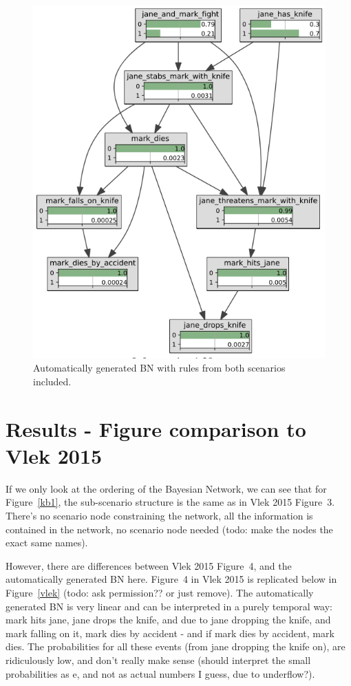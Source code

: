 \begin{figure}[htbp]
\begin{center}
\includegraphics[width=\linewidth]{images/Kb.png}
\caption{Automatically generated BN with rules from both scenarios included.}
\label{full}
\end{center}
\end{figure}

\section{Results - Figure comparison to Vlek 2015}
If we only look at the ordering of the Bayesian Network, we can see that for Figure~\ref{kb1}, the sub-scenario structure is the same as in Vlek 2015 Figure~3. There's no scenario node constraining the network, all the information is contained in the network, no scenario node needed (todo: make the nodes the exact same names).

However, there are differences between Vlek 2015 Figure~4, and the automatically generated BN here. Figure~4 in Vlek 2015 is replicated below in Figure~\ref{vlek} (todo: ask permission?? or just remove). The automatically generated BN is very linear and can be interpreted in a purely temporal way: mark hits jane, jane drops the knife, and due to jane dropping the knife, and mark falling on it, mark dies by accident - and if mark dies by accident, mark dies. The probabilities for all these events (from jane dropping the knife on), are ridiculously low, and don't really make sense (should interpret the small probabilities as e, and not as actual numbers I guess, due to underflow?). 

